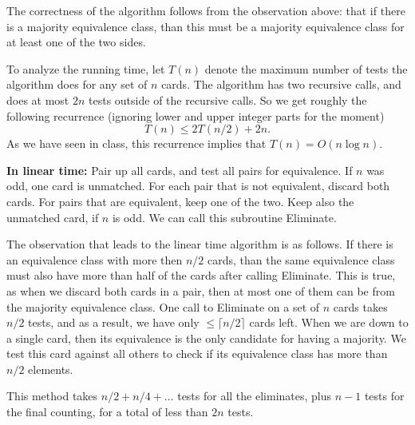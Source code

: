 \documentclass[12pt]{article}
\newcommand{\Xomit}[1]{}
\newcommand{\proof}[1]{
{\noindent {\it Proof.} {#1} \rule{2mm}{2mm} \vskip \belowdisplayskip}
}
\begin{document}
\begin{enumerate}
{The correctness of the algorithm follows from the observation
above: that if there is a majority equivalence class, than this
must be a majority equivalence class for at least one of the two
sides.

To analyze the running time, let $T(n)$ denote the maximum number of
tests the algorithm does for any set of $n$ cards. The algorithm
has two recursive calls, and does at most $2n$ tests outside of the
recursive calls. So we get roughly the following recurrence
(ignoring lower and
upper integer parts for the moment)
\[T(n) \le 2 T(n/2) +2n.\]
As we have seen in class, this recurrence implies
that $T(n) = O(n \log n)$.

\Xomit{
\begin{itemize}
{\em $T(n) \le 2 n\lceil \log_2 n\rceil$.}
The solution of such a recurrence is $O(n\log n)$ as it is shown below.
\end{itemize}
\proof{We prove this statement by induction on the size $n$ of
$S$. When $n=2$ we do one test, so the statement is true.

Let $k=\lceil \log_2 n\rceil$. We need to prove that the number of
tests is at most $2nk$. Assume that $S_i$ has size $n_i$.
Note that $\lceil \log_2 n_i\rceil \le k-1$ for both $i=1,2$.
By the induction hypothesis the two recursive calls do at
most $n_i (k-1)$ tests each, and the total number of tests is
at most
\[2n_1(k-1)+ 2n_2(k-1) +2n =le 2nk.\]
}
}

\vskip 0.2in
\noindent
{\bf  In linear time:}
Pair up all cards, and test all pairs for equivalence. If $n$
was odd, one card is unmatched. For each pair that is not
equivalent, discard both cards. For pairs that are equivalent, keep one of the
two. Keep also the unmatched card, if $n$ is odd. We can call this
subroutine {\sc Eliminate}.

The observation that leads to the linear time algorithm is as follows. If there
is an equivalence class with more then $n/2$ cards, than the same
equivalence class must also have more than half of the cards after
calling {\sc Eliminate}. This is true, as when we discard both cards in
a pair, then at most one of them can be from the majority equivalence class.
One call to {\sc Eliminate} on a set of $n$ cards takes $n/2$ tests, and
as a result, we have only $\le \lceil n/2 \rceil$ cards left. When we are down
to a single card, then its equivalence is the only candidate for having a
majority. We test this card against all others to check if its equivalence
class has more than $n/2$ elements.

This method takes $n/2+n/4+\ldots$ tests for all the eliminates, plus $n-1$
tests for the final counting, for a total of less than $2n$ tests.


}

\end{enumerate}
\end{document}

